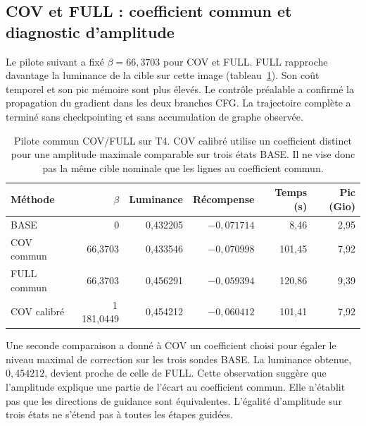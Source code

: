 \documentclass[11pt,a4paper]{article}
\begin{document}
\subsection{COV et FULL : coefficient commun et diagnostic d'amplitude}
Le pilote suivant a fixé $\beta=66{,}3703$ pour COV et FULL. FULL rapproche davantage la luminance de la cible sur cette image (tableau~\ref{tab:full}). Son coût temporel et son pic mémoire sont plus élevés. Le contrôle préalable a confirmé la propagation du gradient dans les deux branches CFG. La trajectoire complète a terminé sans checkpointing et sans accumulation de graphe observée.
\begin{table}[htbp]
\centering\small
\setlength{\tabcolsep}{4pt}
\begin{tabular}{lrrrrr}
\toprule
Méthode & $\beta$ & Luminance & Récompense & Temps (s) & Pic (Gio)\\
\midrule
BASE & 0 & 0,432205 & $-0,071714$ & 8,46 & 2,95\\
COV commun & 66,3703 & 0,433546 & $-0,070998$ & 101,45 & 7,92\\
FULL commun & 66,3703 & 0,456291 & $-0,059394$ & 120,86 & 9,39\\
COV calibré & 1\,181,0449 & 0,454212 & $-0,060412$ & 101,41 & 7,92\\
\bottomrule
\end{tabular}
\caption{Pilote commun COV/FULL sur T4. \og COV calibré\fg{} utilise un coefficient distinct pour une amplitude maximale comparable sur trois états BASE. Il ne vise donc pas la même cible nominale que les lignes au coefficient commun.}
\label{tab:full}
\end{table}

Une seconde comparaison a donné à COV un coefficient choisi pour égaler le niveau maximal de correction sur les trois sondes BASE. La luminance obtenue, $0{,}454212$, devient proche de celle de FULL. Cette observation suggère que l'amplitude explique une partie de l'écart au coefficient commun. Elle n'établit pas que les directions de guidance sont équivalentes. L'égalité d'amplitude sur trois états ne s'étend pas à toutes les étapes guidées.
\end{document}
